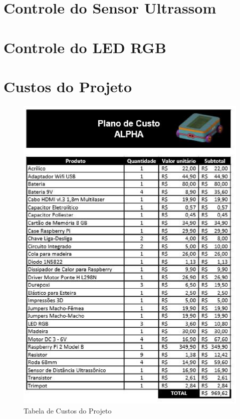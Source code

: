 \begin{apendicesenv}

\partapendices

\chapter{Controle do Sensor Ultrassom}



\chapter{Controle do LED RGB}



\chapter{Custos do Projeto}

\begin{figure}[H]
    \centering
    \includegraphics[width=1\textwidth]{figuras/custos.eps}
    \caption{Tabela de Custos do Projeto}
    \label{fig:custos}
\end{figure}


\end{apendicesenv}
